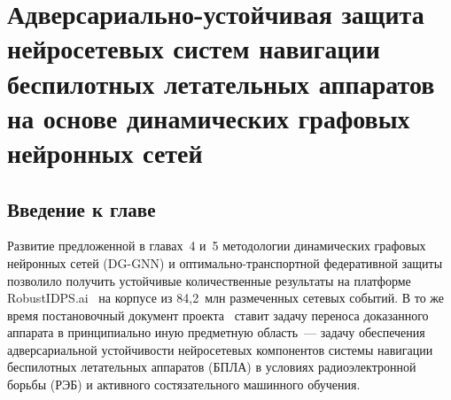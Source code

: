%
%
\providecommand{\Adv}{\mathcal{A}}
\providecommand{\Def}{\mathcal{D}}
\providecommand{\Loss}{\mathcal{L}}
\providecommand{\eps}{\varepsilon}
\providecommand{\Norm}[1]{\left\lVert#1\right\rVert}
\providecommand{\sign}{\operatorname{sign}}

\chapter{Адверсариально-устойчивая защита нейросетевых систем навигации
беспилотных летательных аппаратов на основе динамических графовых
нейронных сетей}
\label{ch:uav_defense}

\section{Введение к главе}
\label{sec:uav_intro}

Развитие предложенной в главах~4 и~5 методологии динамических графовых
нейронных сетей (DG-GNN) и оптимально-транспортной федеративной защиты
позволило получить устойчивые количественные результаты на платформе
\textsf{RobustIDPS.ai}~\cite{robustidps_zenodo} на корпусе из 84{,}2~млн
размеченных сетевых событий. В то же время постановочный документ
проекта~\cite{uav_proposal_2026} ставит задачу переноса доказанного
аппарата в принципиально иную предметную область~--- задачу обеспечения
адверсариальной устойчивости нейросетевых компонентов системы навигации
беспилотных летательных аппаратов (БПЛА) в условиях радиоэлектронной
борьбы (РЭБ) и активного состязательного машинного обучения.

